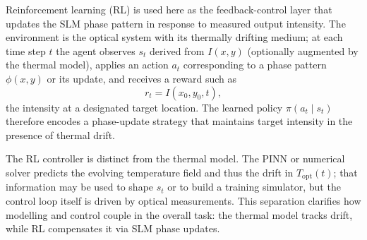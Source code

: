 \documentclass[11pt,letterpaper]{article}
\begin{document}
Reinforcement learning (RL) is used here as the feedback-control layer that updates the SLM
phase pattern in response to measured output intensity. The environment is the optical system
with its thermally drifting medium; at each time step $t$ the agent observes $s_t$ derived from
$I(x,y)$ (optionally augmented by the thermal model), applies an action $a_t$ corresponding to a
phase pattern $\phi(x,y)$ or its update, and receives a reward such as
\begin{equation}
r_t = I(x_0, y_0, t),
\end{equation}
the intensity at a designated target location. The learned policy $\pi(a_t\mid s_t)$ therefore
encodes a phase-update strategy that maintains target intensity in the presence of thermal drift.

The RL controller is distinct from the thermal model. The PINN or numerical solver predicts the
evolving temperature field and thus the drift in $T_{\mathrm{opt}}(t)$; that information may be
used to shape $s_t$ or to build a training simulator, but the control loop itself is driven by
optical measurements. This separation clarifies how modelling and control couple in the overall
task: the thermal model tracks drift, while RL compensates it via SLM phase updates.




\end{document}
